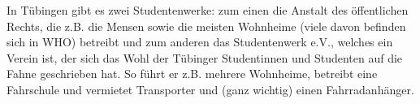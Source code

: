 
In Tübingen gibt es zwei Studentenwerke: zum einen die Anstalt des
  öffentlichen Rechts, die z.B. die Mensen sowie die meisten
  Wohnheime (viele davon befinden sich in WHO) betreibt und zum
  anderen das Studentenwerk e.V., welches ein Verein ist, der sich das Wohl
  der Tübinger Studentinnen und Studenten auf die Fahne geschrieben
  hat.  So führt er z.B. mehrere Wohnheime, betreibt eine Fahrschule
  und vermietet Transporter und (ganz wichtig) einen Fahrradanhänger.
